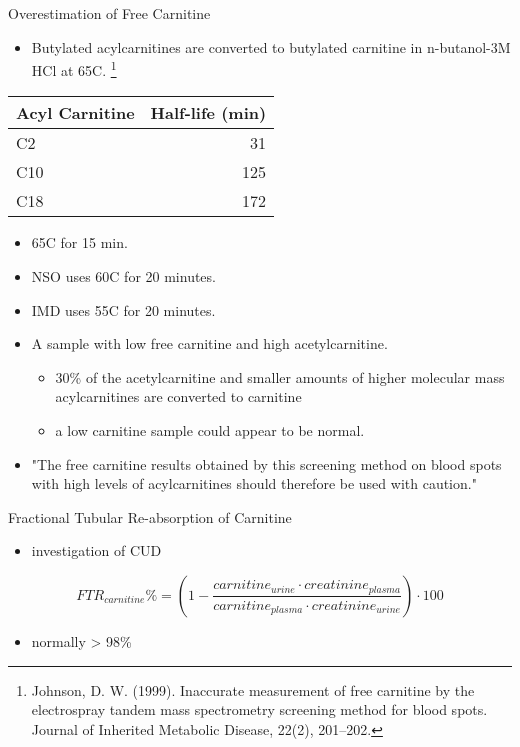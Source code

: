 \documentclass[presentation, smaller]{beamer}
\begin{document}
\begin{frame}[label={sec:orgheadline5}]{Overestimation of Free Carnitine}
\begin{itemize}
\item Butylated acylcarnitines are converted to butylated carnitine in
n-butanol-3M HCl at 65\degree{}C. \footnote{Johnson, D. W. (1999). Inaccurate measurement of free
carnitine by the electrospray tandem mass spectrometry screening
method for blood spots. Journal of Inherited Metabolic Disease, 22(2),
201–202.}
\end{itemize}

\begin{center}
\begin{tabular}{lr}
Acyl Carnitine & Half-life (min)\\
\hline
C2 & 31\\
C10 & 125\\
C18 & 172\\
\end{tabular}
\end{center}

\begin{itemize}
\item 65\degree{}C for 15 min.
\item NSO uses 60\degree{}C for 20 minutes.
\item IMD uses 55\degree{}C for 20 minutes.

\item A sample with low free carnitine and high acetylcarnitine.
\begin{itemize}
\item 30\% of the acetylcarnitine and smaller amounts of higher
molecular mass acylcarnitines are converted to carnitine
\item a low carnitine sample could appear to be normal.
\end{itemize}
\item "The free carnitine results obtained by this screening method on
blood spots with high levels of acylcarnitines should therefore be
used with caution." \footnotemark[1]{}
\end{itemize}
\end{frame}
\begin{frame}[label={sec:orgheadline6}]{Fractional Tubular Re-absorption of Carnitine}
\begin{itemize}
\item investigation of CUD
\end{itemize}

\begin{equation*}
FTR_{carnitine}\% = \left( 1 -  \frac{carnitine_{urine} \cdot creatinine_{plasma}}{carnitine_{plasma} \cdot creatinine_{urine}}\right) \cdot 100
\end{equation*}

\begin{itemize}
\item normally \textgreater{} 98\%
\end{itemize}
\end{frame}
\end{document}
